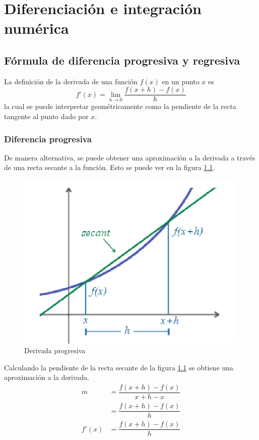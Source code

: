 \chapter{Diferenciación e integración numérica}

\section{Fórmula de diferencia progresiva y regresiva}
La definición de la derivada de una función $f(x)$ en un punto $x$ es
\begin{equation}
	f'(x) = \lim_{h\rightarrow 0} \dfrac{f(x+h)-f(x)}{h}
\end{equation}
la cual se puede interpretar geométricamente como la pendiente de la recta tangente al punto dado por $x$. 

\subsection{Diferencia progresiva}
De manera alternativa, se puede obtener una aproximación a la derivada a través de una recta secante 
a la función. Esto se puede ver en la figura \ref{fig:derivadaProgresiva}.

\begin{figure}[ht]
	\centering
	\includegraphics[scale=0.35]{img/derivadaProgresiva.png}
	\caption{Derivada progresiva}
	\label{fig:derivadaProgresiva}
\end{figure}

Calculando la pendiente de la recta secante de la figura \ref{fig:derivadaProgresiva} se obtiene una aproximación a la derivada.
\begin{align}
	m &= \dfrac{f(x+h)-f(x)}{x+h-x}\nonumber\\
		&= \dfrac{f(x+h)-f(x)}{h}\nonumber\\
	f'(x) &= \dfrac{f(x+h)-f(x)}{h}
	\label{eq:derivadaProgresiva1}
\end{align}

